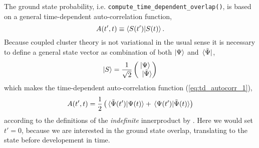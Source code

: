     

    The ground state probability, i.e. \lstinline{compute_time_dependent_overlap()}, is 
    based on a general time-dependent auto-correlation function,
    \begin{equation}
        \label{eq:td_autocorr_1}
        A(t', t) \equiv \braket{S(t')}{S(t)}.
    \end{equation}
    Because coupled cluster theory is not variational in the usual sense it is necessary to 
    define a general state vector as combination of both $\ket{\Psi}$ and $\bra*{\tilde{\Psi}}$,
    \begin{equation}
        \ket{S} = \frac{1}{\sqrt{2}} \begin{pmatrix}
            \ket{\Psi} \\ \ket*{\tilde{\Psi}}
        \end{pmatrix}
    \end{equation}
    which makes the time-dependent auto-correlation function (\autoref{eq:td_autocorr_1}),
    \begin{equation}
        A(t', t) = \frac{1}{2} 
        \left( \braket*{\tilde{\Psi}(t')}{\Psi(t)} 
            +  \braket*{\Psi(t')}{\tilde{\Psi}(t)}  \right)
    \end{equation}
    according to the definitions of the \emph{indefinite} innerproduct by
    \citeauthor{pedersen2019symplectic}\cite{pedersen2019symplectic}. 
    Here we would set $t'=0$, because we are
    interested in the ground state overlap, translating to the state before developement 
    in time.

